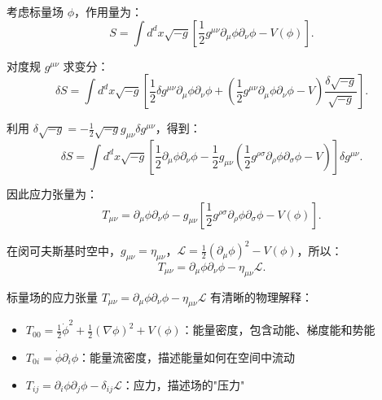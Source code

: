 \begin{example}[标量场的应力张量]
考虑标量场 $\phi$，作用量为：
\begin{equation}
    S = \int d^d x \sqrt{-g} \left[\frac{1}{2} g^{\mu\nu} \partial_\mu \phi \partial_\nu \phi - V(\phi)\right].
\end{equation}

对度规 $g^{\mu\nu}$ 求变分：
\begin{equation}
    \delta S = \int d^d x \sqrt{-g} \left[\frac{1}{2} \delta g^{\mu\nu} \partial_\mu \phi \partial_\nu \phi + \left(\frac{1}{2} g^{\mu\nu} \partial_\mu \phi \partial_\nu \phi - V\right) \frac{\delta \sqrt{-g}}{\sqrt{-g}}\right].
\end{equation}

利用 $\delta \sqrt{-g} = -\frac{1}{2} \sqrt{-g} g_{\mu\nu} \delta g^{\mu\nu}$，得到：
\begin{equation}
    \delta S = \int d^d x \sqrt{-g} \left[\frac{1}{2} \partial_\mu \phi \partial_\nu \phi - \frac{1}{2} g_{\mu\nu} \left(\frac{1}{2} g^{\rho\sigma} \partial_\rho \phi \partial_\sigma \phi - V\right)\right] \delta g^{\mu\nu}.
\end{equation}

因此应力张量为：
\begin{equation}
    T_{\mu\nu} = \partial_\mu \phi \partial_\nu \phi - g_{\mu\nu} \left[\frac{1}{2} g^{\rho\sigma} \partial_\rho \phi \partial_\sigma \phi - V(\phi)\right].
\end{equation}

在闵可夫斯基时空中，$g_{\mu\nu} = \eta_{\mu\nu}$，$\mathcal{L} = \frac{1}{2}(\partial_\mu \phi)^2 - V(\phi)$，所以：
\begin{equation}
    T_{\mu\nu} = \partial_\mu \phi \partial_\nu \phi - \eta_{\mu\nu} \mathcal{L}.
\end{equation}
\end{example}

\begin{note}[标量场应力张量的物理意义]
标量场的应力张量 $T_{\mu\nu} = \partial_\mu \phi \partial_\nu \phi - \eta_{\mu\nu} \mathcal{L}$ 有清晰的物理解释：
\begin{itemize}
    \item $T_{00} = \frac{1}{2}\dot{\phi}^2 + \frac{1}{2}(\nabla\phi)^2 + V(\phi)$：能量密度，包含动能、梯度能和势能
    \item $T_{0i} = \dot{\phi} \partial_i \phi$：能量流密度，描述能量如何在空间中流动
    \item $T_{ij} = \partial_i \phi \partial_j \phi - \delta_{ij} \mathcal{L}$：应力，描述场的"压力"
\end{itemize}
\end{note}


